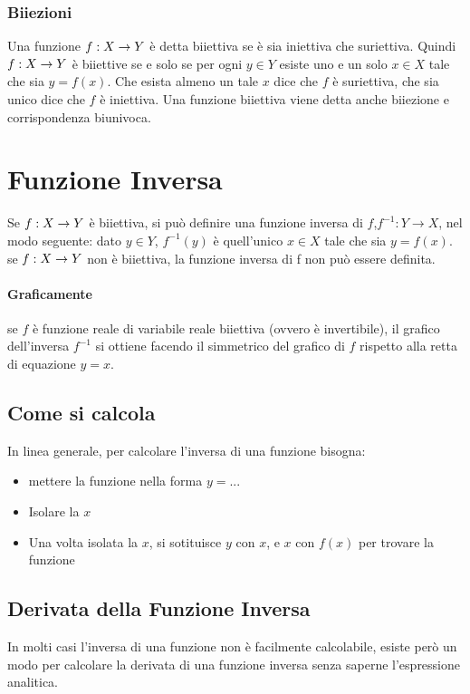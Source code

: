 \documentclass[12pt, a4paper, openany]{book}
\begin{document}
\subsubsection{Biiezioni}
Una funzione $f: X \rightarrow Y$ è detta biiettiva se è sia iniettiva che suriettiva.
Quindi $f: X \rightarrow Y$ è biiettive se e solo se per ogni $y \in Y$ esiste uno e un solo $x \in X$ tale che sia $y = f(x)$.
Che esista almeno un tale $x$ dice che $f$ è suriettiva, che sia unico dice che $f$ è iniettiva.
Una funzione biiettiva viene detta anche biiezione e corrispondenza biunivoca.

\section{Funzione Inversa}
Se $f: X \rightarrow Y$ è biiettiva, si può definire una funzione inversa di $f$,$f^{-1} : Y \rightarrow X$, nel modo seguente:
dato $y \in Y$, $f^{-1}(y)$ è quell'unico $x \in X$ tale che sia $y = f(x)$.
se $f: X \rightarrow Y$ non è biiettiva, la funzione inversa di f non può essere definita.
\paragraph*{Graficamente} se $f$ è funzione reale di variabile reale biiettiva (ovvero è invertibile),
 il grafico dell'inversa $f^{-1}$ si ottiene facendo il simmetrico del grafico di $f$ rispetto alla retta di equazione $y=x$.

\subsection*{Come si calcola}
In linea generale, per calcolare l'inversa di una funzione bisogna:
\begin{itemize}
	\item mettere la funzione nella forma $y=...$
 \item Isolare la $x$
 \item Una volta isolata la $x$, si sotituisce $y$ con $x$, e $x$ con $f(x)$ per trovare la funzione
\end{itemize}

\subsection*{Derivata della Funzione Inversa}
In molti casi l'inversa di una funzione non è facilmente calcolabile,
esiste però un modo per calcolare la derivata di una funzione inversa senza saperne l'espressione analitica.
\end{document}
